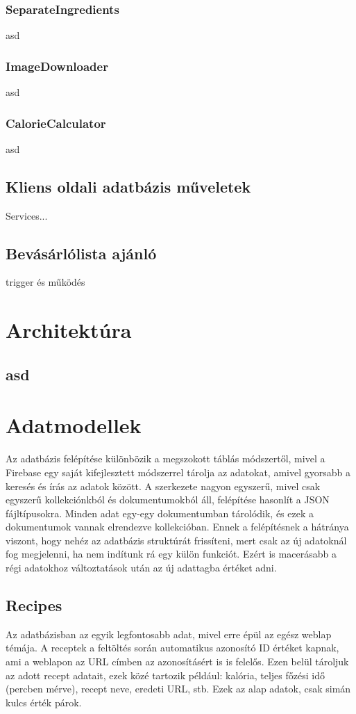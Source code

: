 \documentclass[12pt]{report}
\theoremstyle{definition}
\begin{document}
\subsection{SeparateIngredients}
asd
\subsection{ImageDownloader} 
asd
\subsection{CalorieCalculator}
asd
\section{Kliens oldali adatbázis műveletek}
Services...

\section{Bevásárlólista ajánló}
trigger és működés


\chapter{Architektúra}
\section{asd}


\chapter{Adatmodellek}
Az adatbázis felépítése különbözik a megszokott táblás módszertől, mivel a Firebase egy saját kifejlesztett módszerrel tárolja az adatokat, amivel gyorsabb a keresés és írás az adatok között. A szerkezete nagyon egyszerű, mivel csak egyszerű kollekciónkból és dokumentumokból áll, felépítése hasonlít a JSON fájltípusokra. Minden adat egy-egy dokumentumban tárolódik, és ezek a dokumentumok vannak elrendezve kollekcióban. Ennek a felépítésnek a hátránya viszont, hogy nehéz az adatbázis struktúrát frissíteni, mert csak az új adatoknál fog megjelenni, ha nem indítunk rá egy külön funkciót. Ezért is macerásabb a régi adatokhoz változtatások után az új adattagba értéket adni. 

\section{Recipes}
Az adatbázisban az egyik legfontosabb adat, mivel erre épül az egész weblap témája. A receptek a feltöltés során automatikus azonosító ID értéket kapnak, ami a weblapon az URL címben az azonosításért is is felelős. Ezen belül tároljuk az adott recept adatait, ezek közé tartozik például: kalória, teljes főzési idő (percben mérve), recept neve, eredeti URL, stb. Ezek az alap adatok, csak simán kulcs érték párok. 
\end{document}
